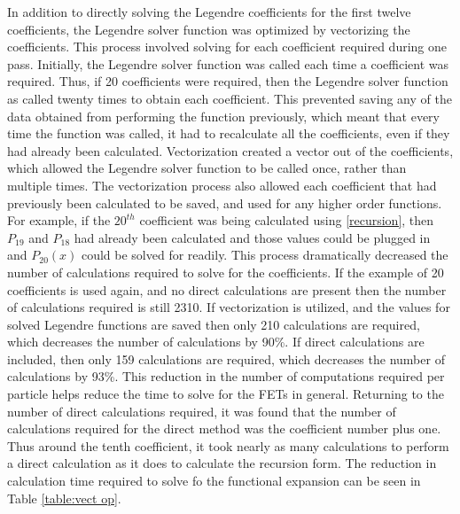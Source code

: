 \documentclass[10tma4paper]{article}
\begin{document}
In addition to directly solving the Legendre coefficients for the first twelve coefficients, the Legendre solver function was optimized by vectorizing the coefficients. This process involved solving for each coefficient required during one pass. Initially, the Legendre solver function was called each time a coefficient was required. Thus, if 20 coefficients were required, then the Legendre solver function as called twenty times to obtain each coefficient. This prevented saving any of the data obtained from performing the function previously, which meant that every time the function was called, it had to recalculate all the coefficients, even if they had already been calculated. Vectorization created a vector out of the coefficients, which allowed the Legendre solver function to be called once, rather than multiple times. The vectorization process also allowed each coefficient that had previously been calculated to be saved, and used for any higher order functions. For example, if the $20^{th}$ coefficient was being calculated using \eqref{recursion}, then $P_{19}$ and $P_{18}$ had already been calculated and those values could be plugged in and $P_{20}(x)$ could be solved for readily. This process dramatically decreased the number of calculations required to solve for the coefficients. If the example of 20 coefficients is used again, and no direct calculations are present then the number of calculations required is still 2310. If vectorization is utilized, and the values for solved Legendre functions are saved then only 210 calculations are required, which decreases the number of calculations by 90\%. If direct calculations are included, then only 159 calculations are required, which decreases the number of calculations by 93\%. This reduction in the number of computations required per particle helps reduce the time to solve for the FETs in general. Returning to the number of direct calculations required, it was found that the number of calculations required for the direct method was the coefficient number plus one. Thus around the tenth coefficient, it took nearly as many calculations to perform a direct calculation as it does to calculate the recursion form. The reduction in calculation time required to solve fo the functional expansion can be seen in Table \ref{table:vect op}.
\end{document}
